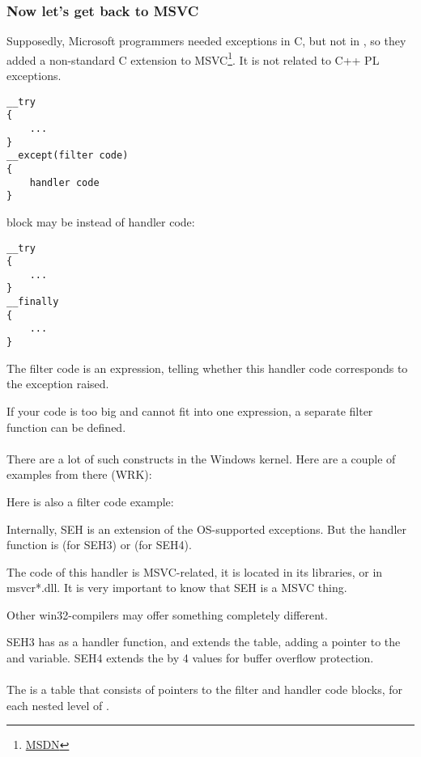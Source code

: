 \subsubsection{Now let's get back to MSVC}


Supposedly, Microsoft programmers needed exceptions in C, but not in \Cpp, so they added a non-standard C extension
to MSVC\footnote{\href{http://go.yurichev.com/17057}{MSDN}}.
It is not related to C++ \ac{PL} exceptions.

\begin{lstlisting}
__try
{
    ...
}
__except(filter code)
{
    handler code
}
\end{lstlisting}

 block may be instead of handler code:

\begin{lstlisting}
__try
{
    ...
}
__finally
{
    ...
}
\end{lstlisting}


The filter code is an expression, telling whether this handler code corresponds to the exception raised.

If your code is too big and cannot fit into one expression, a separate filter function can be defined.\\
\\
There are a lot of such constructs in the Windows kernel.
Here are a couple of examples from there (\ac{WRK}):





Here is also a filter code example:



Internally, SEH is an extension of the OS-supported exceptions.
But the handler function is  (for SEH3) or  (for SEH4).

The code of this handler is MSVC-related, it is located in its libraries, or in msvcr*.dll.
It is very important to know that SEH is a MSVC thing.

Other win32-compilers may offer something completely different.


SEH3 has  
as a handler function, and extends the  table, adding
a pointer to the  and  variable.
SEH4 extends the  
by 4 values for buffer overflow protection.\\
\\
The  is a table that consists of pointers to the filter and handler code blocks, for each nested level of .


